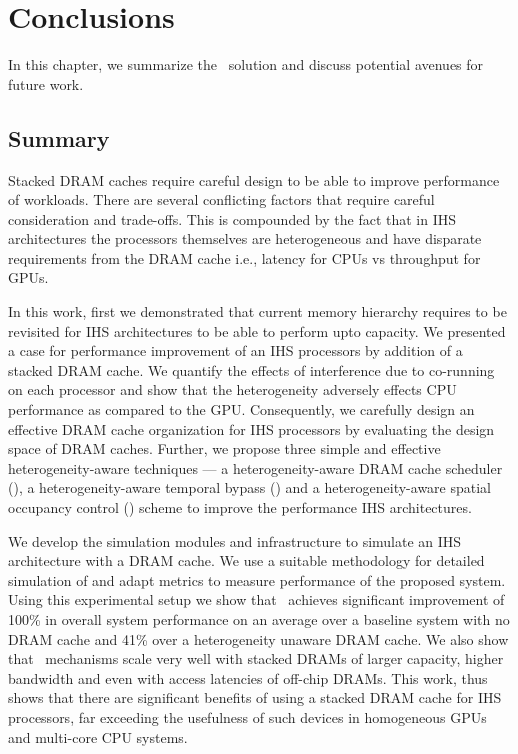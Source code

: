 \chapter{Conclusions} \label{chap:conclusion}
In this chapter, we summarize the \cachename\ solution and discuss potential avenues for future work.
\section{Summary}
Stacked DRAM caches require careful design to be able to improve performance of workloads. There are several conflicting factors that require careful consideration and trade-offs. This is compounded by the fact that in IHS architectures the processors themselves are  heterogeneous and have disparate requirements from the DRAM cache i.e., latency for CPUs vs throughput for GPUs.
\par In this work, first we demonstrated that current memory hierarchy requires to be revisited for IHS architectures to be able to perform upto capacity. We presented a case for performance improvement of an IHS processors by addition of a stacked DRAM cache. 
We quantify the effects of interference due to co-running on each processor and show that the heterogeneity adversely effects CPU performance as compared to the GPU. 
Consequently, we carefully design an effective DRAM cache organization for IHS processors by evaluating the design space of DRAM caches.
Further, we propose three simple and effective heterogeneity-aware techniques --- a heterogeneity-aware DRAM cache scheduler (\prioname), a heterogeneity-aware temporal bypass (\bypassname) and a heterogeneity-aware spatial occupancy control (\chaining) scheme to improve the performance IHS architectures.
\par We develop the simulation modules and infrastructure to simulate an IHS architecture with a DRAM cache. We use a suitable methodology for detailed simulation of \cachename and adapt metrics to measure performance of the proposed system. Using this experimental setup we show that 
\cachename\ achieves significant improvement of 100\% in overall system performance on an average over a baseline system with no DRAM cache and 41\% over a heterogeneity unaware DRAM cache. 
We also show that \cachename\ mechanisms scale very well with stacked DRAMs of larger capacity, higher bandwidth and even with access latencies of off-chip DRAMs.
This work, thus shows that there are significant benefits of using a stacked DRAM cache for IHS processors, far exceeding the usefulness of such devices in homogeneous GPUs and multi-core CPU systems.

